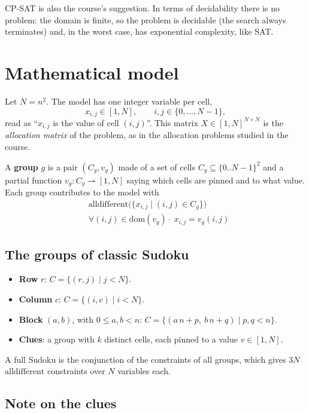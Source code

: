 \documentclass[11pt,a4paper]{article}
\newcommand{\alldiff}{\mathrm{alldifferent}}
\begin{document}
CP-SAT is also the course's suggestion. In terms of decidability there is no problem: the domain is finite, so the problem is decidable (the search always terminates) and, in the worst case, has exponential complexity, like SAT.

\section{Mathematical model}\label{sec:model}

Let $N=n^2$. The model has one integer variable per cell,
\[
  x_{i,j}\in[1,N],\qquad i,j\in\{0,\dots,N-1\},
\]
read as ``$x_{i,j}$ is the value of cell $(i,j)$''. This matrix $X\in[1,N]^{N\times N}$ is the \emph{allocation matrix} of the problem, as in the allocation problems studied in the course.

A \textbf{group} $g$ is a pair $(C_g,v_g)$ made of a set of cells $C_g\subseteq\{0..N-1\}^2$ and a partial function $v_g:C_g\rightharpoonup[1,N]$ saying which cells are pinned and to what value. Each group contributes to the model with
\begin{align}
  & \alldiff\big(\{x_{i,j}\mid (i,j)\in C_g\}\big) \label{eq:alldiff}\\
  & \forall (i,j)\in\mathrm{dom}(v_g)\cdot\ x_{i,j}=v_g(i,j) \label{eq:fix}
\end{align}

\subsection{The groups of classic Sudoku}

\begin{itemize}
  \item \textbf{Row} $r$: $C=\{(r,j)\mid j<N\}$.
  \item \textbf{Column} $c$: $C=\{(i,c)\mid i<N\}$.
  \item \textbf{Block} $(a,b)$, with $0\le a,b<n$: $C=\{(a\,n+p,\ b\,n+q)\mid p,q<n\}$.
  \item \textbf{Clues}: a group with $k$ distinct cells, each pinned to a value $v\in[1,N]$.
\end{itemize}

A full Sudoku is the conjunction of the constraints of all groups, which gives $3N$ $\alldiff$ constraints over $N$ variables each.

\subsection{Note on the clues}\label{sec:clues}
\end{document}
